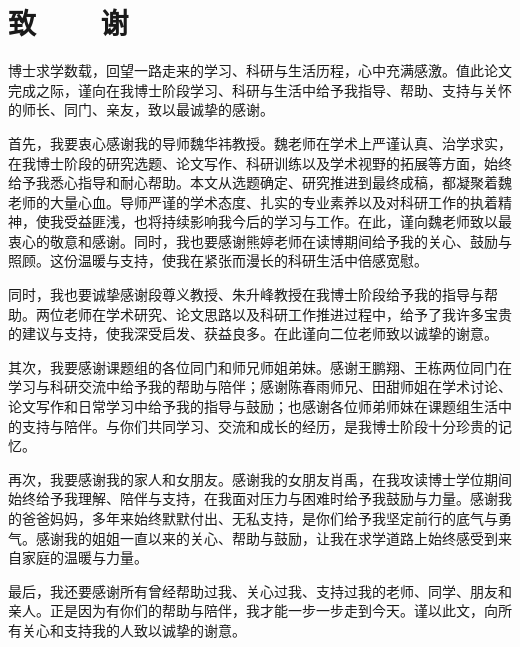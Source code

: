 \chapter*{致~~~~谢}

博士求学数载，回望一路走来的学习、科研与生活历程，心中充满感激。值此论文完成之际，谨向在我博士阶段学习、科研与生活中给予我指导、帮助、支持与关怀的师长、同门、亲友，致以最诚挚的感谢。

首先，我要衷心感谢我的导师{魏华祎}教授。魏老师在学术上严谨认真、治学求实，在我博士阶段的研究选题、论文写作、科研训练以及学术视野的拓展等方面，始终给予我悉心指导和耐心帮助。本文从选题确定、研究推进到最终成稿，都凝聚着魏老师的大量心血。导师严谨的学术态度、扎实的专业素养以及对科研工作的执着精神，使我受益匪浅，也将持续影响我今后的学习与工作。在此，谨向魏老师致以最衷心的敬意和感谢。同时，我也要感谢熊婷老师在读博期间给予我的关心、鼓励与照顾。这份温暖与支持，使我在紧张而漫长的科研生活中倍感宽慰。

同时，我也要诚挚感谢段尊义教授、朱升峰教授在我博士阶段给予我的指导与帮助。两位老师在学术研究、论文思路以及科研工作推进过程中，给予了我许多宝贵的建议与支持，使我深受启发、获益良多。在此谨向二位老师致以诚挚的谢意。

其次，我要感谢课题组的各位同门和师兄师姐弟妹。感谢王鹏翔、王栋两位同门在学习与科研交流中给予我的帮助与陪伴；感谢陈春雨师兄、田甜师姐在学术讨论、论文写作和日常学习中给予我的指导与鼓励；也感谢各位师弟师妹在课题组生活中的支持与陪伴。与你们共同学习、交流和成长的经历，是我博士阶段十分珍贵的记忆。

再次，我要感谢我的家人和女朋友。感谢我的女朋友肖禹，在我攻读博士学位期间始终给予我理解、陪伴与支持，在我面对压力与困难时给予我鼓励与力量。感谢我的爸爸妈妈，多年来始终默默付出、无私支持，是你们给予我坚定前行的底气与勇气。感谢我的姐姐一直以来的关心、帮助与鼓励，让我在求学道路上始终感受到来自家庭的温暖与力量。

最后，我还要感谢所有曾经帮助过我、关心过我、支持过我的老师、同学、朋友和亲人。正是因为有你们的帮助与陪伴，我才能一步一步走到今天。谨以此文，向所有关心和支持我的人致以诚挚的谢意。